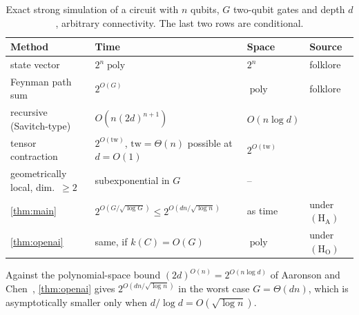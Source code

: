 \documentclass[10pt]{amsart}
\theoremstyle{plain}
\theoremstyle{definition}
\theoremstyle{remark}
\numberwithin{equation}{section}
\newcommand{\poly}{\operatorname{poly}}
\begin{document}
\begin{table}[ht]
\centering
\small
\caption{Exact strong simulation of a circuit with $n$ qubits, $G$ two-qubit gates and depth
$d$, arbitrary connectivity. The last two rows are conditional.}\label{tab:sota}
\begin{tabular}{@{}>{\raggedright\arraybackslash}p{4.4cm}>{\raggedright\arraybackslash}p{4.6cm}>{\raggedright\arraybackslash}p{2.0cm}>{\raggedright\arraybackslash}p{3.6cm}@{}}
\toprule
Method & Time & Space & Source\\
\midrule
state vector & $2^n\poly$ & $2^n$ & folklore\\
Feynman path sum & $2^{O(G)}$ & $\poly$ & folklore\\
recursive (Savitch-type) & $O(n(2d)^{n+1})$ & $O(n\log d)$ & \cite[Thm.~4.1]{AC17}\\
tensor contraction & $2^{O(\mathrm{tw})}$, $\mathrm{tw}=\Theta(n)$ possible at $d=O(1)$ & $2^{O(\mathrm{tw})}$ & \cite{MarkovShi08}\\
geometrically local, dim.\ $\ge2$ & subexponential in $G$ & -- & \cite{WahlStrelchuk}\\
\cref{thm:main} & $2^{O(G/\sqrt{\log G})}\le2^{O(dn/\sqrt{\log n})}$ & as time & under $(\mathrm{H}_{\mathrm{A}})$\\
\cref{thm:openai} & same, if $k(C)=O(G)$ & $\poly$ & under $(\mathrm{H}_{\mathrm{O}})$\\
\bottomrule
\end{tabular}
\end{table}

Against the polynomial-space bound $(2d)^{O(n)}=2^{O(n\log d)}$ of Aaronson and
Chen~\cite{AC17}, \cref{thm:openai} gives $2^{O(dn/\sqrt{\log n})}$ in the worst case $G=\Theta(dn)$,
which is asymptotically smaller only when $d/\log d=O(\sqrt{\log n})$.
\end{document}
